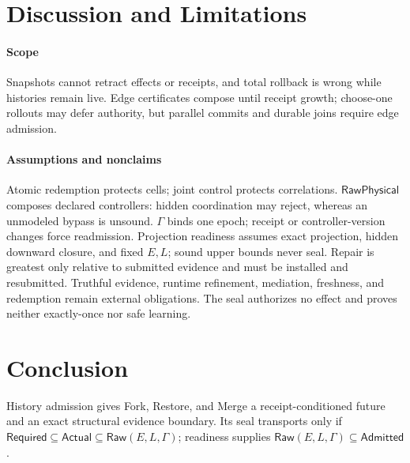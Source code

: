 \section{Discussion and Limitations}
\label{sec:discussion}

\paragraph{Scope}
Snapshots cannot retract effects or receipts, and total rollback is wrong while
histories remain live.  Edge certificates compose until receipt growth;
choose-one rollouts may defer authority, but parallel commits and durable joins
require edge admission.

\paragraph{Assumptions and nonclaims}
Atomic redemption protects cells; joint control protects correlations.
$\mathsf{RawPhysical}$ composes declared controllers: hidden coordination may
reject, whereas an unmodeled bypass is unsound.  $\Gamma$ binds one epoch;
receipt or controller-version changes force readmission.
Projection readiness assumes exact projection, hidden downward closure, and
fixed $E,L$; sound upper bounds never seal.  Repair is greatest only relative
to submitted evidence and must be installed and resubmitted.  Truthful evidence,
runtime refinement, mediation, freshness, and redemption remain external
obligations.
The seal authorizes no effect and proves neither exactly-once nor safe learning.

\section{Conclusion}

History admission gives Fork, Restore, and Merge a receipt-conditioned future
and an exact structural evidence boundary.  Its seal transports only if
$\mathsf{Required}\subseteq\mathsf{Actual}
\subseteq\mathsf{Raw}(E,L,\Gamma)$; readiness supplies
$\mathsf{Raw}(E,L,\Gamma)\subseteq\mathsf{Admitted}$.
